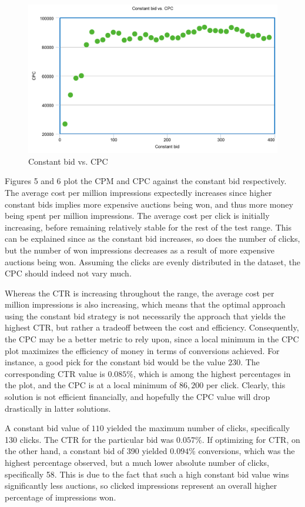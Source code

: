 \documentclass{sig-alternate-05-2015}
\begin{document}
\begin{figure}
  \includegraphics[width=\linewidth]{constant_cpc.png}
  \caption{Constant bid vs. CPC}
  \label{fig:CPM}
\end{figure}

Figures 5 and 6 plot the CPM and CPC against the constant bid respectively. The average cost per million impressions expectedly increases since higher constant bids implies more expensive auctions being won, and thus more money being spent per million impressions. The average cost per click is initially increasing, before remaining relatively stable for the rest of the test range. This can be explained since as the constant bid increases, so does the number of clicks, but the number of won impressions decreases as a result of more expensive auctions being won. Assuming the clicks are evenly distributed in the dataset, the CPC should indeed not vary  much.

Whereas the CTR is increasing throughout the range, the average cost per million impressions is also increasing, which means that the optimal approach using the constant bid strategy is not necessarily the approach that yields the highest CTR, but rather a tradeoff between the cost and efficiency. Consequently, the CPC may be a better metric to rely upon, since a local minimum in the CPC plot maximizes the efficiency of money in terms of conversions achieved. For instance, a good pick for the constant bid would be the value $230$. The corresponding CTR value is $0.085\%$, which is among the highest percentages in the plot, and the CPC is at a local minimum of $86,200$ per click. Clearly, this solution is not efficient financially, and hopefully the CPC value will drop drastically in latter solutions.

A constant bid value of $110$ yielded the maximum number of clicks, specifically 130 clicks. The CTR for the particular bid was $0.057\%$. If optimizing for CTR, on the other hand, a constant bid of 390 yielded $0.094\%$ conversions, which was the highest percentage observed, but a much lower absolute number of clicks, specifically 58. This is due to the fact that such a high constant bid value wins significantly less auctions, so clicked impressions represent an overall higher percentage of impressions won.
\end{document}
